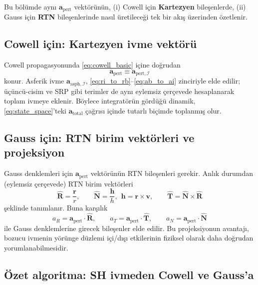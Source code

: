 Bu bölümde aynı $\mathbf a_{\text{pert}}$ vektörünün,
(i) Cowell için \textbf{Kartezyen} bileşenlerde,
(ii) Gauss için \textbf{RTN} bileşenlerinde
nasıl üretileceği tek bir akış üzerinden özetlenir.

\subsection{Cowell için: Kartezyen ivme vektörü}
\label{subsec:cowell_cart}

Cowell propagasyonunda \eqref{eq:cowell_basic} içine doğrudan
\[
\mathbf a_{\text{pert}}\equiv \mathbf a_{\text{pert},\mathcal I}
\]
konur. Asferik ivme $\mathbf a_{\text{asph},\mathcal I}$,
\eqref{eq:ri_to_rb}--\eqref{eq:ab_to_ai} zinciriyle elde edilir; üçüncü-cisim ve SRP gibi terimler de aynı eylemsiz çerçevede
hesaplanarak toplam ivmeye eklenir. Böylece integratörün gördüğü dinamik,
\eqref{eq:state_space}’teki $\mathbf a_{\text{total}}$ çağrısı içinde tutarlı biçimde toplanmış olur.

\subsection{Gauss için: RTN birim vektörleri ve projeksiyon}
\label{subsec:rtn_projection}

Gauss denklemleri için $\mathbf a_{\text{pert}}$ vektörünün RTN bileşenleri gerekir.
Anlık durumdan (eylemsiz çerçevede) RTN birim vektörleri
\begin{equation}
\hat{\mathbf R}=\frac{\mathbf r}{r},\qquad
\hat{\mathbf N}=\frac{\mathbf h}{h},\ \ \mathbf h=\mathbf r\times\mathbf v,\qquad
\hat{\mathbf T}=\hat{\mathbf N}\times\hat{\mathbf R}
\label{eq:rtn_basis}
\end{equation}
şeklinde tanımlanır. Buna karşılık
\begin{equation}
a_R=\mathbf a_{\text{pert}}\cdot \hat{\mathbf R},\qquad
a_T=\mathbf a_{\text{pert}}\cdot \hat{\mathbf T},\qquad
a_N=\mathbf a_{\text{pert}}\cdot \hat{\mathbf N}
\label{eq:rtn_components}
\end{equation}
ile Gauss denklemlerine girecek bileşenler elde edilir.
Bu projeksiyonun avantajı, bozucu ivmenin yörünge düzlemi içi/dışı etkilerinin fiziksel olarak daha doğrudan yorumlanabilmesidir.

\subsection{Özet algoritma: SH ivmeden Cowell ve Gauss’a}
\label{subsec:algo_summary}

